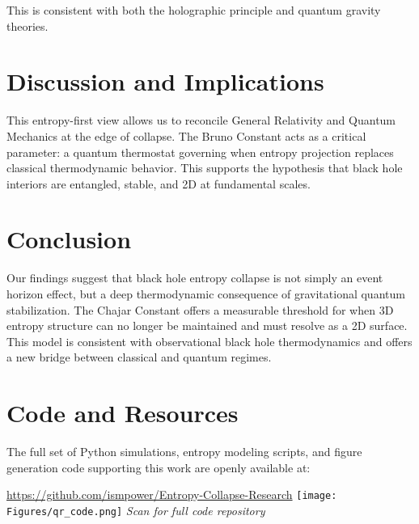 \documentclass[12pt]{article}
\begin{document}
This is consistent with both the holographic principle and quantum gravity theories.

\section{Discussion and Implications}
This entropy-first view allows us to reconcile General Relativity and Quantum Mechanics at the edge of collapse. The Bruno Constant acts as a critical parameter: a quantum thermostat governing when entropy projection replaces classical thermodynamic behavior. This supports the hypothesis that black hole interiors are entangled, stable, and 2D at fundamental scales.

\section{Conclusion}

Our findings suggest that black hole entropy collapse is not simply an event horizon effect, but a deep thermodynamic consequence of gravitational quantum stabilization. The Chajar Constant offers a measurable threshold for when 3D entropy structure can no longer be maintained and must resolve as a 2D surface. This model is consistent with observational black hole thermodynamics and offers a new bridge between classical and quantum regimes.

\section*{Code and Resources}

The full set of Python simulations, entropy modeling scripts, and figure generation code supporting this work are openly available at:
\begin{center}
\url{https://github.com/ismpower/Entropy-Collapse-Research}
\texttt{[image: Figures/qr\_code.png]}
\textit{Scan for full code repository}\

\end{center}
\end{document}
